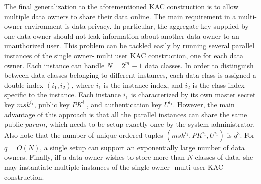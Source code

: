 The final generalization to the aforementioned KAC construction is to allow multiple data owners to share their data online. The main requirement in a multi-owner environment is data privacy. In particular, the aggregate key supplied by one data owner should not leak information about another data owner to an unauthorized user. This problem can be tackled easily by running several parallel instances of the single owner- multi user KAC construction, one for each data owner. Each instance can handle $N=2^m-1$ data classes. In order to distinguish between data classes belonging to different instances, each data class is assigned a double index $(i_1,i_2)$, where $i_1$ is the instance index, and $i_2$ is the class index specific to the instance. Each instance $i_1$ is characterized by its own master secret key $msk^{i_1}$, public key $PK^{i_1}$, and authentication key $U^{i_1}$. However, the main advantage of this approach is that all the parallel instances can share the same public $param$, which needs to be setup exactly once by the system administrator. Also note that the number of unique ordered tuples $\left(msk^{i_1},PK^{i_1},U^{i_1}\right)$ is $q^3$. For $q=O(N)$, a single setup can support an exponentially large number of data owners. Finally, iff a data owner wishes to store more than $N$ classes of data, she may instantiate multiple instances of the single owner- multi user KAC construction. 

